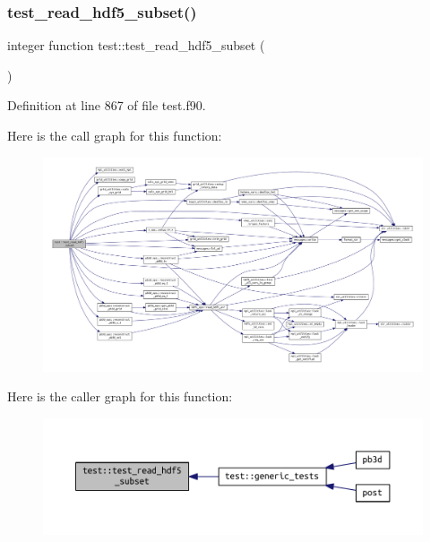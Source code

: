 \subsubsection{\texorpdfstring{test\+\_\+read\+\_\+hdf5\+\_\+subset()}{test\_read\_hdf5\_subset()}}
{\footnotesize\ttfamily integer function test\+::test\+\_\+read\+\_\+hdf5\+\_\+subset (\begin{DoxyParamCaption}{ }\end{DoxyParamCaption})}



Definition at line 867 of file test.\+f90.

Here is the call graph for this function\+:
\nopagebreak
\begin{figure}[H]
\begin{center}
\leavevmode
\includegraphics[width=350pt]{namespacetest_ac574f08ba400cd61070a6a6f13f6f7ee_cgraph}
\end{center}
\end{figure}
Here is the caller graph for this function\+:
\nopagebreak
\begin{figure}[H]
\begin{center}
\leavevmode
\includegraphics[width=350pt]{namespacetest_ac574f08ba400cd61070a6a6f13f6f7ee_icgraph}
\end{center}
\end{figure}
